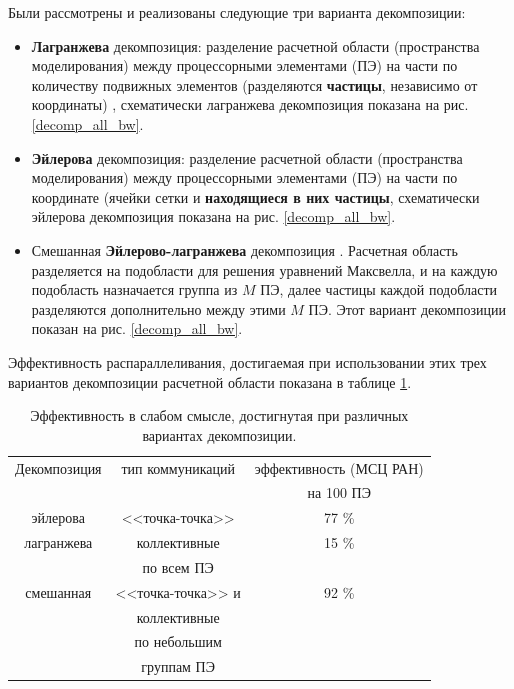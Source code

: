 Были рассмотрены и реализованы следующие три варианта декомпозиции:

\begin{itemize}
\item \textbf{Лагранжева} декомпозиция: разделение расчетной области (пространства моделирования) между процессорными элементами (ПЭ) на части по количеству подвижных элементов
(разделяются \textbf{частицы}, независимо от координаты) , схематически лагранжева декомпозиция показана на рис. \ref{decomp_all_bw}.

\item \textbf{Эйлерова} декомпозиция: разделение расчетной области (пространства моделирования) между процессорными элементами (ПЭ) на части по координате (ячейки сетки и \textbf{находящиеся в них частицы}, схематически эйлерова декомпозиция показана на рис. \ref{decomp_all_bw}.

\item Смешанная \textbf{Эйлерово-лагранжева} декомпозиция \cite{VychMethProgExa}. Расчетная область разделяется на подобласти для решения уравнений Максвелла, и на каждую подобласть назначается группа из $M$ ПЭ, далее частицы каждой подобласти разделяются дополнительно между этими $M$ ПЭ. Этот вариант декомпозиции показан на рис. \ref{decomp_all_bw}.

\end{itemize}

Эффективность распараллеливания, достигаемая при использовании  этих трех вариантов декомпозиции расчетной области показана в таблице \ref{effcompare}. 



\begin{table}[ht]
\caption{Эффективность в слабом смысле, достигнутая при различных вариантах декомпозиции.}
\begin{center}

\begin{tabular}{|c|c|c|}
\hline
Декомпозиция & тип коммуникаций        &  эффективность (МСЦ РАН) \\
             &                         &  на 100 ПЭ\\ \hline
эйлерова     & <<точка-точка>>         &   77 \%  \\ \hline
 лагранжева  & коллективные            &   15 \%  \\
             &  по всем ПЭ             &        \\ \hline
 смешанная   & <<точка-точка>> и       &   92 \%  \\ 
             & коллективные            &       \\
             & по небольшим            &        \\ 
             & группам ПЭ              &      \\ \hline 
\end{tabular}
\end{center}
\label{effcompare}
\end{table}





